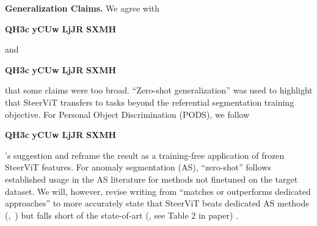 \documentclass[10pt,twocolumn,letterpaper]{article}
\renewcommand{\paragraph}[1]{\vspace{1mm}\noindent\textbf{#1}}
\newcommand{\reviewertag}[2]{%
  \textcolor{#1}{\textbf{#2}}%
}
\DeclareRobustCommand{\R}[1]{%
  \ifcase#1\relax
    \PackageError{reviewers}{Reviewer number must be 1--4}{}%
  \or
    \reviewertag{revone}{QH3c}%
  \or
    \reviewertag{revtwo}{yCUw}%
  \or
    \reviewertag{revthree}{LjJR}%
  \or
    \reviewertag{revfour}{SXMH}%
  \else
    \PackageError{reviewers}{Reviewer number must be 1--4}{}%
  \fi
}
\begin{document}
\paragraph{Generalization Claims.}
We agree with \R1 and \R4 that some claims were too broad. 
``Zero-shot generalization'' was used to highlight that SteerViT transfers to tasks beyond the referential segmentation training objective.
For Personal Object Discrimination (PODS), we follow \R1's suggestion and reframe the result as a training-free application of frozen SteerViT features. 
For anomaly segmentation (AS), ``zero-shot'' follows established usage in the AS literature 
for methods not finetuned on the target dataset.
We will, however, revise writing from ``matches or outperforms dedicated approaches'' to more accurately state that SteerViT 
beats dedicated AS methods (\cite{WinCLIP_Jeong23CVPR},~\cite{hicsonmez2026training})
but falls short of the state-of-art (\cite{li2024_fade}, see Table 2 in paper)%
.
\end{document}
